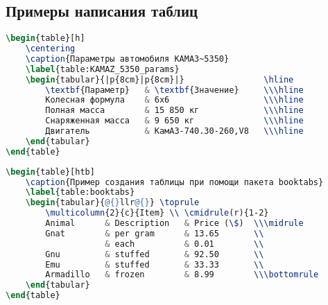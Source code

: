 \begin{appendices}
\chapter{Примеры написания таблиц}
\label{appendix:tables}

\begin{lstlisting}[language=TeX,
    caption=Исходный код таблицы \ref{table:KAMAZ_5350_params},
    label=code:table1]
\begin{table}[h]
    \centering
    \caption{Параметры автомобиля КАМАЗ~5350}
    \label{table:KAMAZ_5350_params}
    \begin{tabular}{|p{8cm}|p{8cm}|}                \hline 
        \textbf{Параметр}   & \textbf{Значение}     \\\hline
        Колесная формула    & 6x6                   \\\hline
        Полная масса        & 15 850 кг             \\\hline
        Снаряженная масса   & 9 650 кг              \\\hline
        Двигатель           & КамАЗ-740.30-260,V8   \\\hline
    \end{tabular}
\end{table}
\end{lstlisting}

\begin{lstlisting}[language=TeX,
    caption=Исходный код таблицы \ref{table:booktabs},
    label=code:table2]
\begin{table}[htb]
    \caption{Пример создания таблицы при помощи пакета booktabs}
    \label{table:booktabs}
    \begin{tabular}{@{}llr@{}} \toprule
        \multicolumn{2}{c}{Item} \\ \cmidrule(r){1-2}
        Animal      & Description   & Price (\$)  \\\midrule
        Gnat        & per gram      & 13.65       \\
                    & each          & 0.01        \\
        Gnu         & stuffed       & 92.50       \\
        Emu         & stuffed       & 33.33       \\
        Armadillo   & frozen        & 8.99        \\\bottomrule
    \end{tabular}
\end{table}
\end{lstlisting}


\end{appendices}
